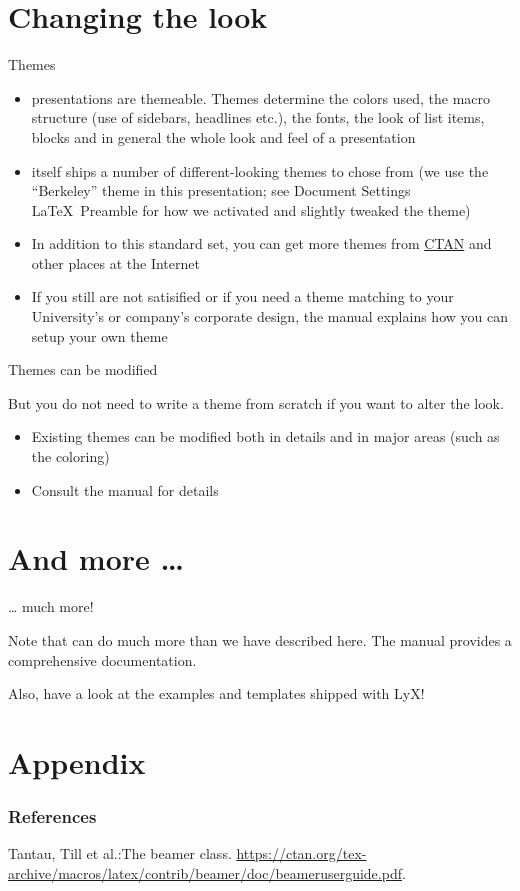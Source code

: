 \documentclass[english]{beamer}
\begin{document}
\section{Changing the look}
\begin{frame}{Themes}
\begin{itemize}
\item {} presentations are themeable. Themes determine
the colors used, the macro structure (use of sidebars, headlines etc.),
the fonts, the look of list items, blocks and in general the whole
look and feel of a presentation
\item {} itself ships a number of different-looking themes
to chose from (we use the ``Berkeley'' theme in this presentation;
see \alert{Document \textrightarrow Settings \textrightarrow LaTeX~Preamble} for
how we activated and slightly tweaked the theme)
\item In addition to this standard set, you can get more themes from \href{http://www.ctan.org}{CTAN}
and other places at the Internet
\item If you still are not satisified or if you need a theme matching to
your University's or company's corporate design, the 
manual \cite{beamer-ug} explains how you can setup your own theme
\end{itemize}
\end{frame}
%
\begin{frame}{Themes can be modified}

But you do not need to write a theme from scratch if you want to alter
the look.
\begin{itemize}
\item Existing themes can be modified both in details and in major areas
(such as the coloring)
\item Consult the  manual \cite{beamer-ug} for details
\end{itemize}
\end{frame}

\section{And more \ldots}
\begin{frame}{\ldots{} much more!}

Note that  can do much more than we have described
here. The  manual \cite{beamer-ug} provides a
comprehensive documentation.

Also, have a look at the  examples and templates
shipped with LyX!
\end{frame}

\appendix

\section{Appendix}

\begin{frame}

\frametitle<presentation>{References}
\begin{thebibliography}{1}
Tantau, Till et al.:\newblock The beamer class.
\url{https://ctan.org/tex-archive/macros/latex/contrib/beamer/doc/beameruserguide.pdf}.
\end{thebibliography}
\end{frame}
\end{document}
